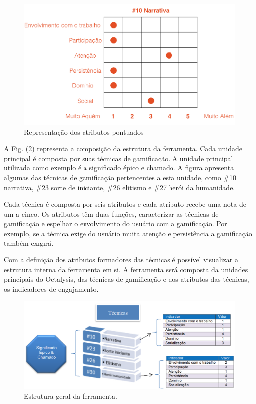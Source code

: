 \begin{figure}[h]
	\centering
		\includegraphics[keepaspectratio=true,scale=0.5]{figuras/notas.png}
	\caption{Representação dos atributos pontuados\label{fig02}}
\end{figure}

\newpage


A Fig. (\ref{fig03}) representa a composição da estrutura da ferramenta. Cada unidade principal é composta por suas técnicas de gamificação. A unidade principal utilizada como exemplo é a significado épico e chamado. A figura apresenta algumas das técnicas de gamificação pertencentes a esta unidade, como \#10 narrativa, \#23 sorte de iniciante, \#26 elitismo e \#27 herói da humanidade. 

Cada técnica é composta por seis atributos e cada atributo recebe uma nota de um a cinco. Os atributos têm duas funções, caracterizar as técnicas de gamificação e espelhar o envolvimento do usuário com a gamificação. Por exemplo, se a técnica exige do usuário muita atenção e persistência a gamificação também exigirá. 

Com a definição dos atributos formadores das técnicas é possível visualizar a estrutura interna da ferramenta em si. A ferramenta será composta da unidades principais do Octalysis, das técnicas de gamificação e dos atributos das técnicas, os indicadores de engajamento. 


\begin{figure}[h]
	\centering
		\includegraphics[keepaspectratio=true,scale=0.25]{figuras/mapeamento.png}
	\caption{Estrutura geral da ferramenta.\label{fig03}
}
\end{figure}


